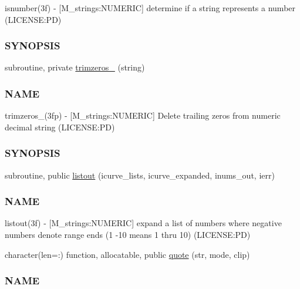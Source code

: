 \begin{DoxyCompactItemize}
\begin{DoxyCompactList}
isnumber(3f) -\/ \mbox{[}M\+\_\+strings\+:N\+U\+M\+E\+R\+IC\mbox{]} determine if a string represents a number (L\+I\+C\+E\+N\+SE\+:PD) \subsubsection*{S\+Y\+N\+O\+P\+S\+IS}\end{DoxyCompactList}\item 
subroutine, private \mbox{\hyperlink{namespacem__strings_aedbeefa963a63edc16b10e2a833eb609}{trimzeros\+\_\+}} (string)
\begin{DoxyCompactList}\small\item\em \subsubsection*{N\+A\+ME}

trimzeros\+\_\+(3fp) -\/ \mbox{[}M\+\_\+strings\+:N\+U\+M\+E\+R\+IC\mbox{]} Delete trailing zeros from numeric decimal string (L\+I\+C\+E\+N\+SE\+:PD) \subsubsection*{S\+Y\+N\+O\+P\+S\+IS}\end{DoxyCompactList}\item 
subroutine, public \mbox{\hyperlink{namespacem__strings_a81b4b7f4f301b9e17604adbcace58d0c}{listout}} (icurve\+\_\+lists, icurve\+\_\+expanded, inums\+\_\+out, ierr)
\begin{DoxyCompactList}\small\item\em \subsubsection*{N\+A\+ME}

listout(3f) -\/ \mbox{[}M\+\_\+strings\+:N\+U\+M\+E\+R\+IC\mbox{]} expand a list of numbers where negative numbers denote range ends (1 -\/10 means 1 thru 10) (L\+I\+C\+E\+N\+SE\+:PD) \end{DoxyCompactList}\item 
character(len=\+:) function, allocatable, public \mbox{\hyperlink{namespacem__strings_a3596a4ec755ac897a1dbc0b225d5266a}{quote}} (str, mode, clip)
\begin{DoxyCompactList}\small\item\em \subsubsection*{N\+A\+ME}


\end{DoxyCompactList}
\end{DoxyCompactItemize}
